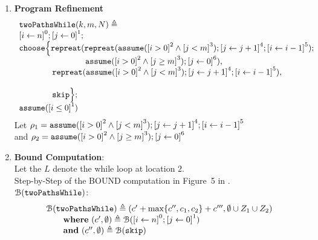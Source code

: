 \begin{enumerate}
  \item \textbf{Program Refinement}
  \\
  \[
    \begin{array}{l}
      \kw{twoPathsWhile}(k, m, N) \triangleq \\
      \clabel{ \assign{i}{n} }^{0} ; 
      \clabel{ \assign{j}{0} }^{1} ; \\
      \rpchoose\Big\{ 
        \rprepeat(\rprepeat(\rpasum(\clabel{i > 0}^{2} \land \clabel{j < m}^{3}); \clabel{\assign{j}{j + 1}}^{4}; \clabel{\assign{i}{i - 1}}^{5});\\
      \qquad \qquad \qquad \qquad \rpasum(\clabel{i > 0}^{2} \land \clabel{j \geq m}^{3}); \clabel{\assign{j}{0}}^{6}),
      \\ \qquad \qquad 
      \rprepeat(\rpasum(\clabel{i > 0}^{2} \land \clabel{j < m}^{3}); \clabel{\assign{j}{j + 1}}^{4}; \clabel{\assign{i}{i - 1}}^{5}),\\
      \\ \qquad \qquad  \eskip
      \Big\};\\
      \rpasum(\clabel{i \leq 0}^{1})
      \end{array}
    \]
Let $\rho_1 = \rpasum(\clabel{i > 0}^{2} \land \clabel{j < m}^{3}); \clabel{\assign{j}{j + 1}}^{4}; \clabel{\assign{i}{i - 1}}^{5}$
\\
and $\rho_2 = \rpasum(\clabel{i > 0}^{2} \land \clabel{j \geq m}^{3}); \clabel{\assign{j}{0}}^{6}$
  \item \textbf{Bound Computation}:
  \\
  Let the $L$ denote the while loop at location $2$.
  \\
  Step-by-Step of the BOUND computation in Figure~5 in \cite{GulwaniJK09}.
  \\
  \newcommand{\BD}{\mathcal{B}}
  $\BD(\kw{twoPathsWhile})$:
  \[
    \begin{array}{l}
      \BD(\kw{twoPathsWhile})  \triangleq  
      (c' + \max\{c'', c_1, c_2\} + c''', \emptyset \cup Z_1 \cup Z_2) 
      \\ \qquad
  \textbf{where} ~(c', \emptyset) \triangleq  \BD(\clabel{ \assign{i}{n} }^{0} ; \clabel{ \assign{j}{0} }^{1})
  \\ \qquad
  \textbf{and} ~(c'', \emptyset) \triangleq  \BD(\eskip)
  \\ \qquad

\end{array}\]
\end{enumerate}
